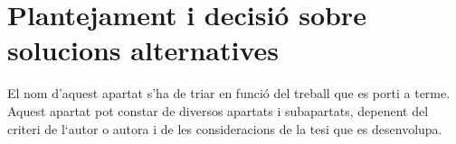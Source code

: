 \chapter{Plantejament i decisió sobre solucions alternatives}

El nom d’aquest apartat s'ha de triar en funció del treball que es porti a terme. Aquest apartat pot constar de diversos apartats i subapartats, depenent del criteri de l‘autor o autora i de les consideracions de la tesi que es desenvolupa.